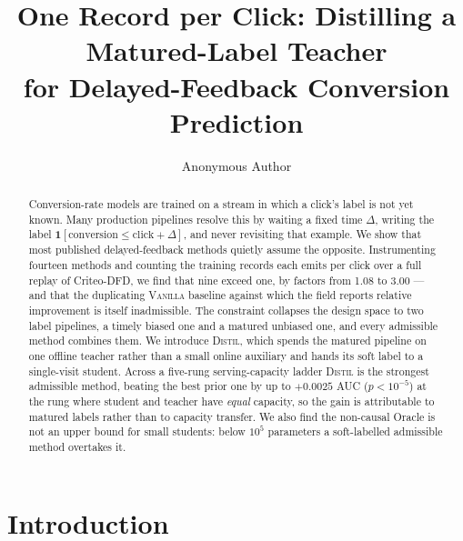 \documentclass[runningheads]{llncs}
\newcommand{\ind}{\mathbf{1}}
\begin{document}
\title{One Record per Click: Distilling a Matured-Label Teacher\\for Delayed-Feedback Conversion
Prediction}

\author{Anonymous Author}

\maketitle

\begin{abstract}
Conversion-rate models are trained on a stream in which a click's label is not yet known. Many
production pipelines resolve this by waiting a fixed time $\Delta$, writing the label
$\ind[\text{conversion} \le \text{click} + \Delta]$, and never revisiting that example. We show that
most published delayed-feedback methods quietly assume the opposite. Instrumenting fourteen methods
and counting the training records each emits per click over a full replay of Criteo-DFD, we find
that nine exceed one, by factors from 1.08 to 3.00 --- and that the duplicating \textsc{Vanilla}
baseline against which the field reports relative improvement is itself inadmissible. The constraint
collapses the design space to two label pipelines, a timely biased one and a matured unbiased one,
and every admissible method combines them. We introduce \textsc{Distil}, which spends the matured
pipeline on one offline teacher rather than a small online auxiliary and hands its soft label to a
single-visit student. Across a five-rung serving-capacity ladder \textsc{Distil} is the strongest
admissible method, beating the best prior one by up to $+0.0025$ AUC ($p\!<\!10^{-5}$) at the rung
where student and teacher have \emph{equal} capacity, so the gain is attributable to matured labels
rather than to capacity transfer. We also find the non-causal Oracle is not an upper bound for small
students: below $10^{5}$ parameters a soft-labelled admissible method overtakes it.
\end{abstract}

\section{Introduction}
\end{document}
